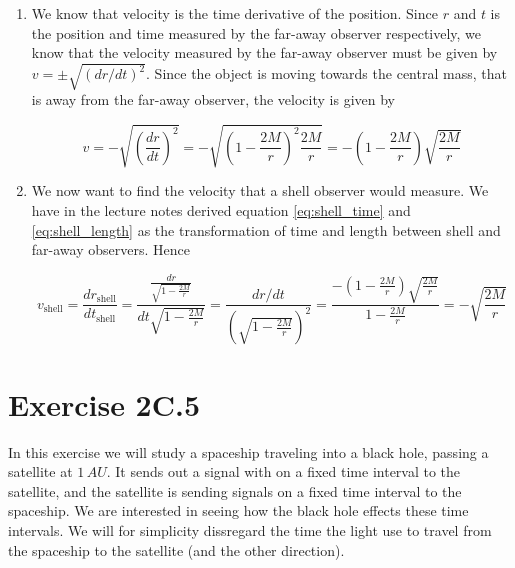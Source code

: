 \documentclass[a4paper,10pt,english]{article}
\begin{document}
\begin{enumerate}
\item We know that velocity is the time derivative of the position. Since $r$ and $t$ is the position and time measured by the far-away observer respectively, we know that the velocity measured by the far-away observer must be given by $v=\pm\sqrt{(dr/dt)^{2}}$. Since the object is moving towards the central mass, that is away from the far-away observer, the velocity is given by

\begin{equation*}
v=-\sqrt{\left(\frac{dr}{dt}\right)^{2}}=-\sqrt{\left(1-\frac{2M}{r}\right)^{2}\frac{2M}{r}}=-\left(1-\frac{2M}{r}\right)\sqrt{\frac{2M}{r}}
\end{equation*}


\item We now want to find the velocity that a shell observer would measure. We have in the lecture notes derived equation \ref{eq:shell_time} and \ref{eq:shell_length} as the transformation of time and length between shell and far-away observers. Hence

\begin{equation*}
v_{\text{shell}}=\frac{dr_{\text{shell}}}{dt_{\text{shell}}}=\frac{\frac{dr}{\sqrt{1-\frac{2M}{r}}}}{dt\sqrt{1-\frac{2M}{r}}}=\frac{dr/dt}{\left(\sqrt{1-\frac{2M}{r}}\right)^{2}}=\frac{-\left(1-\frac{2M}{r}\right)\sqrt{\frac{2M}{r}}}{1-\frac{2M}{r}}=-\sqrt{\frac{2M}{r}}
\end{equation*}


\end{enumerate}








\section*{Exercise 2C.5}

In this exercise we will study a spaceship traveling into a black hole, passing a satellite at $1\,AU$. It sends out a signal with on a fixed time interval to the satellite, and the satellite is sending signals on a fixed time interval to the spaceship. We are interested in seeing how the black hole effects these time intervals. We will for simplicity dissregard the time the light use to travel from the spaceship to the satellite (and the other direction). 
\end{document}
